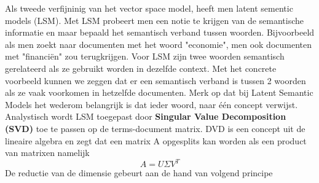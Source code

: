 Als tweede verfijninig van het vector space model, heeft men latent sementic models (LSM). Met LSM probeert men een notie te krijgen van de semantische informatie en maar bepaald het semantisch verband tussen woorden. Bijvoorbeeld als men zoekt naar documenten met het woord "economie", men ook documenten met "financi\"en" zou terugkrijgen. Voor LSM zijn twee woorden semantisch gerelateerd als ze gebruikt worden in dezelfde context. Met het concrete voorbeeld kunnen we zeggen dat er een semantisch verband is tussen 2 woorden als ze vaak voorkomen in hetzelfde documenten.
\newline
Merk op dat bij Latent Semantic Models het wederom belangrijk is dat ieder woord, naar \'e\'en concept verwijst.
%
Analystisch wordt LSM toegepast door \textbf{Singular Value Decomposition (SVD)} toe te passen op de terms-document matrix. DVD is een concept uit de lineaire algebra en zegt dat een matrix A opgesplits kan worden als een product van matrixen namelijk \\
\[A = U\Sigma V^T \]
De reductie van de dimensie gebeurt aan de hand van volgend principe
%
\newcommand{\vect}{\mathbf}
\newcommand{\nul}{\operatorname{Nul}}
\newcommand{\col}{\operatorname{Kolommen }}
\newcommand{\row}{\operatorname{Rijen}}
